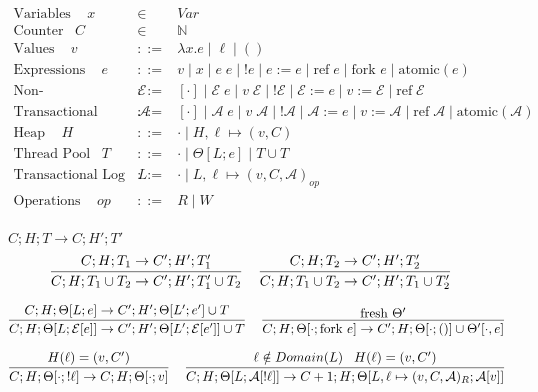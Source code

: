 \documentclass[9pt]{article}
\newcommand{\aeval}[1]{\mathcal{A}[#1]}
\newcommand{\actxt}[0]{\mathcal{A}}
\newcommand{\eval}[1]{\mathcal{E}[#1]}
\newcommand{\ctxt}[0]{\mathcal{E}}
\newcommand{\loc}[0]{\ell}
\newcommand{\atomic}[1]{\text{atomic}(#1)}
\newcommand{\alloc}[1]{\text{ref} \; #1}
\newcommand{\fork}[1]{\text{fork } #1}
\begin{document}
\begingroup\makeatletter{}\check@mathfonts


\begin{displaymath}
\begin{array}{rcll}
\text{Variables } \;\;\; x &\in& Var \\
\text{Counter} \;\;\; C &\in& \mathbb{N} \\
\text{Values } \;\;\; v &::=& \lambda x. e \; | \; \loc \; | \; () \\
\text{Expressions } \;\;\; e &::=& v \; | \; x \; | \; e \; e \; | \; !e \; | \; e := e \; | \; \alloc{e} \; | \; \fork{e} \; | \; \atomic{e}\\
\text{Non-Transactional Context } \;\;\; \ctxt &::=& [\cdot] \; | \; \ctxt \; e \; | \; v \; \ctxt \; | \; ! \ctxt \; | \; \ctxt := e \; | \; v := \ctxt \; | \; \alloc{\ctxt} \\
\text{Transactional Context } \;\;\; \actxt &::=& [\cdot] \; | \; \actxt \; e \; | \; v \; \actxt \; | \; ! \actxt \; | \; \actxt := e \; | \; v := \actxt \; | \; \alloc{\actxt} \; | \; \atomic{\actxt} \\
\text{Heap } \;\;\; H &::=& \cdot \; | \; H, \loc \mapsto (v, C) \\
\text{Thread Pool} \;\;\; T &::=& \cdot \; | \; \Theta[L; e] \; | \; T \cup T \\
\text{Transactional Log } \;\;\; L &::=& \cdot \; | \; L, \loc \mapsto (v, C, \actxt)_{op}  \\
\text{Operations } \;\;\; op &::=& R \; | \; W \\
\end{array}
\end{displaymath}

$\boxed{C; H; T \rightarrow C; H' ;T'}$
\[%
\infer[]{C; H; T_1 \cup T_2 \rightarrow C'; H'; T_1' \cup T_2}{C; H; T_1 \rightarrow C'; H'; T_1'} \;\;\;
\infer[]{C; H; T_1 \cup T_2 \rightarrow C'; H'; T_1 \cup T_2'}{C; H; T_2 \rightarrow C'; H'; T_2'} \;\;\; 
\]

\[%
\infer[]{C; H; \Theta[L; \eval{e}] \rightarrow C'; H'; \Theta[L'; \eval{e'}] \cup T}{C; H; \Theta[L; e] \rightarrow C'; H'; \Theta[L'; e'] \cup T} \;\;\;
\infer[]{C; H; \Theta[\cdot; \fork{e}] \rightarrow C'; H; \Theta[\cdot; ()] \cup \Theta'[\cdot, e]}{\text{fresh } \Theta'}
\]

\[%
\infer[]{C; H; \Theta[\cdot; !\loc] \rightarrow C; H; \Theta[\cdot; v]}{H(\loc) = (v, C')} \;\;\;
\infer[]{C; H; \Theta[L; \aeval{!\loc}] \rightarrow C+1; H; \Theta[L, \loc \mapsto (v, C, \actxt)_R; \aeval{v}]}{\loc \notin Domain(L) \;\;\; H(\loc) = (v, C') } 
\]
\end{document}
